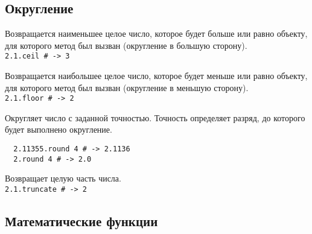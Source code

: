 \subsection*{Округление}

\begin{methodlist}
  Возвращается наименьшее целое число, которое будет больше или равно объекту, для которого метод был вызван (округление в большую сторону).
  \\\verb!2.1.ceil # -> 3!

  Возвращается наибольшее целое число, которое будет меньше или равно объекту, для которого метод был вызван (округление в меньшую сторону).
  \\\verb!2.1.floor # -> 2!

  Округляет число с заданной точностью. Точность определяет разряд, до которого будет выполнено округление.
  \begin{verbatim}
  2.11355.round 4 # -> 2.1136
  2.round 4 # -> 2.0
  \end{verbatim} 

  Возвращает целую часть числа.
  \\\verb!2.1.truncate # -> 2!
\end{methodlist}

\subsection*{Математические функции}

